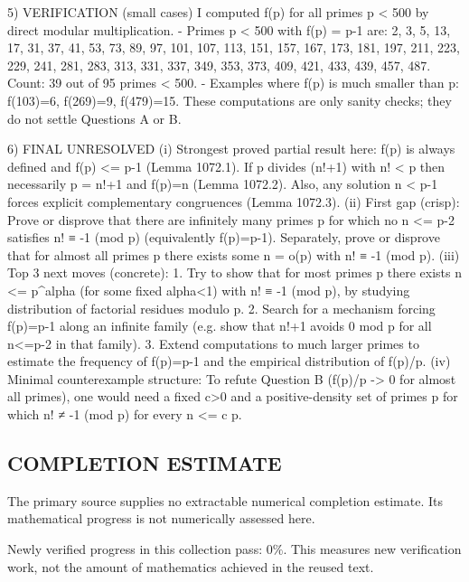 5) VERIFICATION (small cases)
I computed f(p) for all primes p < 500 by direct modular multiplication.
- Primes p < 500 with f(p) = p-1 are:
  2, 3, 5, 13, 17, 31, 37, 41, 53, 73, 89, 97, 101, 107, 113, 151, 157, 167, 173, 181, 197, 211, 223, 229, 241, 281, 283, 313, 331, 337, 349, 353, 373, 409, 421, 433, 439, 457, 487.
  Count: 39 out of 95 primes < 500.
- Examples where f(p) is much smaller than p: f(103)=6, f(269)=9, f(479)=15.
These computations are only sanity checks; they do not settle Questions A or B.

6) FINAL
UNRESOLVED
(i) Strongest proved partial result here: f(p) is always defined and f(p) <= p-1 (Lemma 1072.1). If p divides (n!+1) with n! < p then necessarily p = n!+1 and f(p)=n (Lemma 1072.2). Also, any solution n < p-1 forces explicit complementary congruences (Lemma 1072.3).
(ii) First gap (crisp): Prove or disprove that there are infinitely many primes p for which no n <= p-2 satisfies n! ≡ -1 (mod p) (equivalently f(p)=p-1). Separately, prove or disprove that for almost all primes p there exists some n = o(p) with n! ≡ -1 (mod p).
(iii) Top 3 next moves (concrete):
  1. Try to show that for most primes p there exists n <= p^alpha (for some fixed alpha<1) with n! ≡ -1 (mod p), by studying distribution of factorial residues modulo p.
  2. Search for a mechanism forcing f(p)=p-1 along an infinite family (e.g. show that n!+1 avoids 0 mod p for all n<=p-2 in that family).
  3. Extend computations to much larger primes to estimate the frequency of f(p)=p-1 and the empirical distribution of f(p)/p.
(iv) Minimal counterexample structure: To refute Question B (f(p)/p -> 0 for almost all primes), one would need a fixed c>0 and a positive-density set of primes p for which n! ≠ -1 (mod p) for every n <= c p.




\subsection*{COMPLETION ESTIMATE}
The primary source supplies no extractable numerical completion estimate. Its mathematical progress is not numerically assessed here.

Newly verified progress in this collection pass: $0\%$. This measures new verification work, not the amount of mathematics achieved in the reused text.
